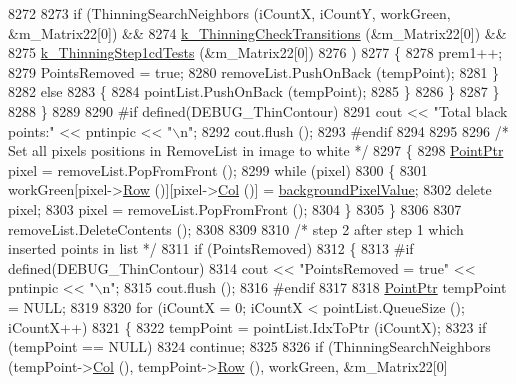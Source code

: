 \begin{DoxyCode}
8272 
8273         \textcolor{keywordflow}{if} (ThinningSearchNeighbors  (iCountX, iCountY, workGreen, &m\_Matrix22[0])  &&
8274             \hyperlink{_raster_8cpp_a26369c862acddcbd9e8b1eb2913adb20}{k\_ThinningCheckTransitions} (&m\_Matrix22[0])                          
         &&
8275             \hyperlink{_raster_8cpp_a18dbacc13d461016bbced3e8c9973757}{k\_ThinningStep1cdTests}     (&m\_Matrix22[0])
8276            )
8277         \{
8278           prem1++;
8279           PointsRemoved = \textcolor{keyword}{true};
8280           removeList.PushOnBack (tempPoint);
8281         \}
8282         \textcolor{keywordflow}{else}
8283         \{
8284           pointList.PushOnBack (tempPoint);
8285         \}
8286       \}
8287     \}
8288   \}
8289 
8290 \textcolor{preprocessor}{  #if  defined(DEBUG\_ThinContour)}
8291     cout << \textcolor{stringliteral}{"Total black points:"} << pntinpic << \textcolor{stringliteral}{"\(\backslash\)n"};
8292     cout.flush ();
8293 \textcolor{preprocessor}{  #endif}
8294 
8295 
8296   \textcolor{comment}{/* Set all pixels positions in RemoveList in image to white */}
8297   \{
8298     \hyperlink{class_k_k_b_1_1_point}{PointPtr}  pixel = removeList.PopFromFront ();
8299     \textcolor{keywordflow}{while}  (pixel)
8300     \{
8301       workGreen[pixel->\hyperlink{class_k_k_b_1_1_point_abfc34bcf809fc9fb95baf5c745b07549}{Row} ()][pixel->\hyperlink{class_k_k_b_1_1_point_afb196b03757fc697f6ade0129a1c7fcf}{Col} ()] = \hyperlink{class_k_k_b_1_1_raster_ab7ed2191cce116a6a37029dc6e3713ef}{backgroundPixelValue};
8302       \textcolor{keyword}{delete} pixel;
8303       pixel = removeList.PopFromFront ();
8304     \}
8305   \}
8306   
8307   removeList.DeleteContents ();
8308 
8309 
8310   \textcolor{comment}{/* step 2 after step 1 which inserted points in list */}
8311   \textcolor{keywordflow}{if}  (PointsRemoved)
8312   \{
8313 \textcolor{preprocessor}{    #if  defined(DEBUG\_ThinContour)}
8314       cout << \textcolor{stringliteral}{"PointsRemoved = true"} << pntinpic << \textcolor{stringliteral}{"\(\backslash\)n"};
8315       cout.flush ();
8316 \textcolor{preprocessor}{    #endif}
8317 
8318     \hyperlink{class_k_k_b_1_1_point}{PointPtr}  tempPoint = NULL;
8319 
8320     \textcolor{keywordflow}{for}  (iCountX = 0; iCountX < pointList.QueueSize ();  iCountX++)
8321     \{
8322       tempPoint = pointList.IdxToPtr (iCountX);
8323       \textcolor{keywordflow}{if}  (tempPoint == NULL)
8324         \textcolor{keywordflow}{continue};
8325 
8326       \textcolor{keywordflow}{if}  (ThinningSearchNeighbors  (tempPoint->\hyperlink{class_k_k_b_1_1_point_afb196b03757fc697f6ade0129a1c7fcf}{Col} (), tempPoint->\hyperlink{class_k_k_b_1_1_point_abfc34bcf809fc9fb95baf5c745b07549}{Row} (),  workGreen, &m\_Matrix22[0]

\end{DoxyCode}
